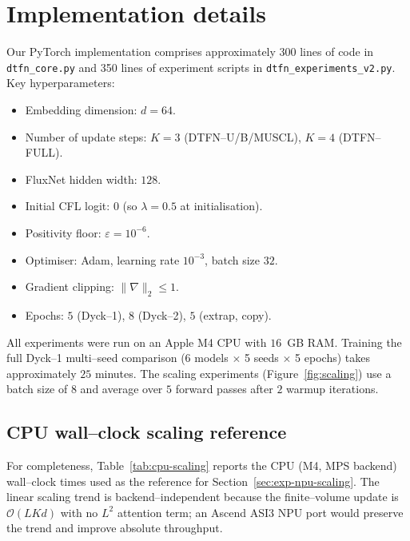 \documentclass[10pt]{article}
\theoremstyle{definition}
\theoremstyle{remark}
\newcommand{\Eps}{\varepsilon}
\begin{document}
\section{Implementation details}
\label{app:implementation}

Our PyTorch implementation comprises approximately 300 lines of code
in \texttt{dtfn\_core.py} and 350 lines of experiment scripts in
\texttt{dtfn\_experiments\_v2.py}.  Key hyperparameters:

\begin{itemize}[leftmargin=*,itemsep=2pt]
  \item Embedding dimension: $d=64$.
  \item Number of update steps: $K=3$ (DTFN--U/B/MUSCL), $K=4$ (DTFN--FULL).
  \item FluxNet hidden width: $128$.
  \item Initial CFL logit: $0$ (so $\lambda = 0.5$ at initialisation).
  \item Positivity floor: $\Eps = 10^{-6}$.
  \item Optimiser: Adam, learning rate $10^{-3}$, batch size $32$.
  \item Gradient clipping: $\|\nabla\|_2 \le 1$.
  \item Epochs: $5$ (Dyck--1), $8$ (Dyck--2), $5$ (extrap, copy).
\end{itemize}

All experiments were run on an Apple M4 CPU with $16$~GB RAM.
Training the full Dyck--1 multi--seed comparison (6 models $\times$ 5
seeds $\times$ 5 epochs) takes approximately $25$ minutes.  The
scaling experiments (Figure~\ref{fig:scaling}) use a batch size of
$8$ and average over $5$ forward passes after $2$ warmup iterations.

\subsection{CPU wall--clock scaling reference}
\label{app:cpu-scaling}

For completeness, Table~\ref{tab:cpu-scaling} reports the CPU
(M4, MPS backend) wall--clock times used as the reference for
Section~\ref{sec:exp-npu-scaling}.  The linear scaling trend is
backend--independent because the finite--volume update is
$\mathcal{O}(L K d)$ with no $L^2$ attention term; an Ascend ASI3
NPU port would preserve the trend and improve absolute throughput.
\end{document}
